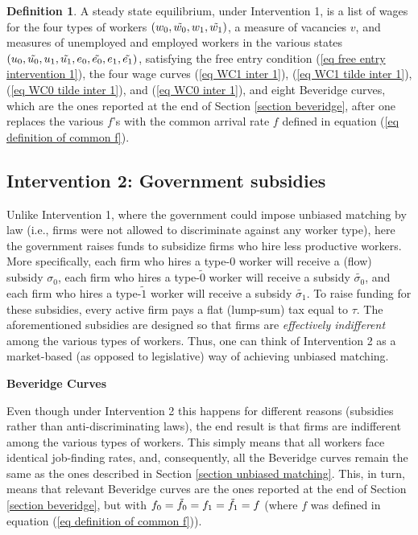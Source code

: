 \documentclass[12pt]{article} %
\theoremstyle{definition}
\newtheorem{definition}{Definition}%
\begin{document}
\bigskip 

\begin{definition}\label{definition equil inter 1}
    A steady state equilibrium, under Intervention 1, is a list of wages for the four types of workers $(w_0, \Tilde{w_0}, w_1, \Tilde{w_1})$, a measure of vacancies $v$, and measures of unemployed and employed workers in the various states $(u_0, \Tilde{u_0}, u_1, \Tilde{u_1}, e_0, \Tilde{e_0}, e_1, \Tilde{e_1})$, satisfying the free entry condition (\ref{eq free entry intervention 1}), the four wage curves (\ref{eq WC1 inter 1}), (\ref{eq WC1 tilde inter 1}), (\ref{eq WC0 tilde inter 1}), and (\ref{eq WC0 inter 1}), and eight Beveridge curves, which are the ones reported at the end of Section \ref{section beveridge}, after one replaces the various $f$'s with the common arrival rate $f$ defined in equation (\ref{eq definition of common f}).
\end{definition} 



\subsection{Intervention 2: Government subsidies}\label{section government subsidies}


Unlike Intervention 1, where the government could impose unbiased matching by law (i.e., firms were not allowed to discriminate against any worker type), here the government raises funds to subsidize firms who hire less productive workers. More specifically, each firm who hires a type-0 worker will receive a (flow) subsidy $\sigma_0$, each firm who hires a type-$\tilde{0}$ worker will receive a subsidy $\tilde{\sigma_0}$, and each firm who hires a type-$\tilde{1}$ worker will receive a subsidy $\tilde{\sigma_1 }$. To raise funding for these subsidies, every active firm pays a flat (lump-sum) tax equal to $\tau$. The aforementioned subsidies are designed so that firms are \textit{effectively indifferent} among the various types of workers. Thus, one can think of Intervention 2 as a market-based (as opposed to legislative) way of achieving unbiased matching. 


\bigskip 

\noindent \textbf{Beveridge Curves} 

\noindent Even though under Intervention 2 this happens for different reasons (subsidies rather than anti-discriminating laws), the end result is that firms are indifferent among the various types of workers. This simply means that all workers face identical job-finding rates, and, consequently, all the Beveridge curves remain the same as the ones described in Section \ref{section unbiased matching}. This, in turn, means that relevant Beveridge curves are the ones reported at the end of Section \ref{section beveridge}, but with $f_0=\Tilde{f_0}=f_1=\Tilde{f_1}=f$ (where $f$ was defined in equation (\ref{eq definition of common f})). 
\end{document}
